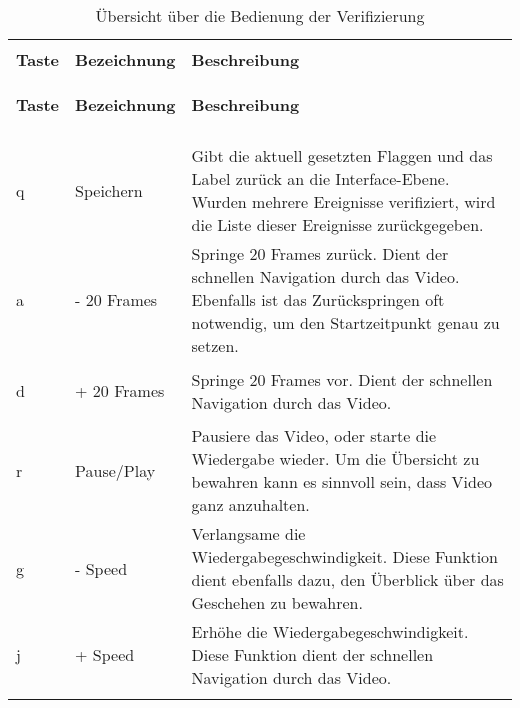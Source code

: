 \begin{longtable}{>{\bfseries} p{} p{} p{}}
\caption{Übersicht über die Bedienung der Verifizierung}\\
\label{tab:VeriBedienElem}\\

\textbf{Taste} & \textbf{Bezeichnung} & \textbf{Beschreibung} \\
\hline
\endfirsthead

\textbf{Taste} & \textbf{Bezeichnung} & \textbf{Beschreibung} \\
\hline
\endhead

\multicolumn{3}{r}{Fortsetzung auf der nächsten Seite...} \\
\endfoot

\hline
\endlastfoot

q & Speichern & Gibt die aktuell gesetzten Flaggen und das Label zurück an die Interface-Ebene. Wurden mehrere Ereignisse verifiziert, wird die Liste dieser Ereignisse zurückgegeben.\\
\addlinespace[0.7em] %

a & - 20 Frames & Springe 20 Frames zurück. Dient der schnellen Navigation durch das Video. Ebenfalls ist das Zurückspringen oft notwendig, um den Startzeitpunkt genau zu setzen.\\
\addlinespace[0.7em] %

d & + 20 Frames & Springe 20 Frames vor. Dient der schnellen Navigation durch das Video. \\
\addlinespace[0.7em] %

r & Pause/Play & Pausiere das Video, oder starte die Wiedergabe wieder. Um die Übersicht zu bewahren kann es sinnvoll sein, dass Video ganz anzuhalten. \\
\addlinespace[0.7em] %

g & - Speed & Verlangsame die Wiedergabegeschwindigkeit. Diese Funktion dient ebenfalls dazu, den Überblick über das Geschehen zu bewahren.\\
\addlinespace[0.7em] %

j & + Speed & Erhöhe die Wiedergabegeschwindigkeit. Diese Funktion dient der schnellen Navigation durch das Video. \\
\addlinespace[0.7em] %


\end{longtable}
